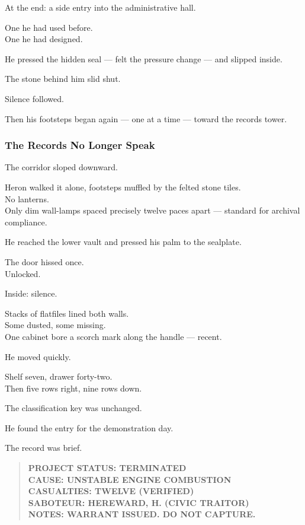\documentclass[12pt]{article}
\begin{document}
At the end: a side entry into the administrative hall.

One he had used before.\\
One he had designed.

He pressed the hidden seal — felt the pressure change — and slipped inside.

\vspace{1em}

The stone behind him slid shut.

Silence followed.

Then his footsteps began again — one at a time — toward the records tower.

\dotfill

\subsubsection{The Records No Longer Speak}

The corridor sloped downward.

Heron walked it alone, footsteps muffled by the felted stone tiles.\\
No lanterns.\\
Only dim wall-lamps spaced precisely twelve paces apart — standard for archival compliance.

He reached the lower vault and pressed his palm to the sealplate.

The door hissed once.\\
Unlocked.

\vspace{1em}

Inside: silence.

Stacks of flatfiles lined both walls.\\
Some dusted, some missing.\\
One cabinet bore a scorch mark along the handle — recent.

He moved quickly.

Shelf seven, drawer forty-two.\\
Then five rows right, nine rows down.

The classification key was unchanged.

\vspace{1em}

He found the entry for the demonstration day.

The record was brief.

\begin{quote}
\textbf{PROJECT STATUS: TERMINATED}\\
\textbf{CAUSE: UNSTABLE ENGINE COMBUSTION}\\
\textbf{CASUALTIES: TWELVE (VERIFIED)}\\
\textbf{SABOTEUR: HEREWARD, H. (CIVIC TRAITOR)}\\
\textbf{NOTES: WARRANT ISSUED. DO NOT CAPTURE.}
\end{quote}
\end{document}
